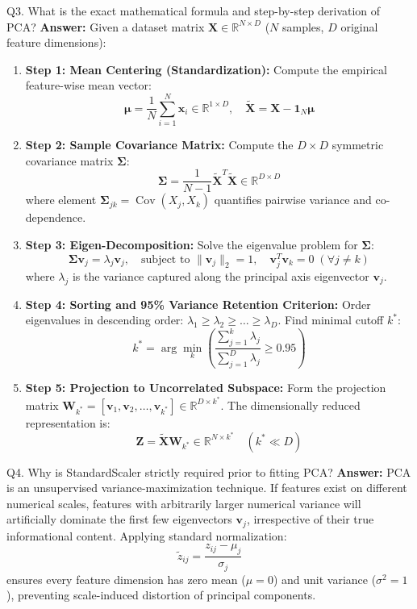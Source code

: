 \documentclass[a4paper, 11pt]{article}
\begin{document}
\begin{questionbox}{Q3. What is the exact mathematical formula and step-by-step derivation of PCA?}
\textbf{Answer:}
Given a dataset matrix $\mathbf{X} \in \mathbb{R}^{N \times D}$ ($N$ samples, $D$ original feature dimensions):

\begin{enumerate}
    \item \textbf{Step 1: Mean Centering (Standardization):}
    Compute the empirical feature-wise mean vector:
    \[
    \mathbf{\mu} = \frac{1}{N}\sum_{i=1}^N \mathbf{x}_i \in \mathbb{R}^{1 \times D}, \quad \mathbf{\tilde{X}} = \mathbf{X} - \mathbf{1}_N \mathbf{\mu}
    \]
    \item \textbf{Step 2: Sample Covariance Matrix:}
    Compute the $D \times D$ symmetric covariance matrix $\mathbf{\Sigma}$:
    \[
    \mathbf{\Sigma} = \frac{1}{N - 1}\mathbf{\tilde{X}}^T \mathbf{\tilde{X}} \in \mathbb{R}^{D \times D}
    \]
    where element $\mathbf{\Sigma}_{jk} = \operatorname{Cov}(X_j, X_k)$ quantifies pairwise variance and co-dependence.
    \item \textbf{Step 3: Eigen-Decomposition:}
    Solve the eigenvalue problem for $\mathbf{\Sigma}$:
    \[
    \mathbf{\Sigma} \mathbf{v}_j = \lambda_j \mathbf{v}_j, \quad \text{subject to } \|\mathbf{v}_j\|_2 = 1, \quad \mathbf{v}_j^T \mathbf{v}_k = 0 \; (\forall j \neq k)
    \]
    where $\lambda_j$ is the variance captured along the principal axis eigenvector $\mathbf{v}_j$.
    \item \textbf{Step 4: Sorting and 95\% Variance Retention Criterion:}
    Order eigenvalues in descending order: $\lambda_1 \ge \lambda_2 \ge \dots \ge \lambda_D$. Find minimal cutoff $k^*$:
    \[
    k^* = \arg\min_{k} \left( \frac{\sum_{j=1}^k \lambda_j}{\sum_{j=1}^D \lambda_j} \ge 0.95 \right)
    \]
    \item \textbf{Step 5: Projection to Uncorrelated Subspace:}
    Form the projection matrix $\mathbf{W}_{k^*} = [\mathbf{v}_1, \mathbf{v}_2, \dots, \mathbf{v}_{k^*}] \in \mathbb{R}^{D \times k^*}$. The dimensionally reduced representation is:
    \[
    \mathbf{Z} = \mathbf{\tilde{X}} \mathbf{W}_{k^*} \in \mathbb{R}^{N \times k^*} \quad (k^* \ll D)
    \]
\end{enumerate}
\end{questionbox}

\begin{questionbox}{Q4. Why is StandardScaler strictly required prior to fitting PCA?}
\textbf{Answer:}
PCA is an unsupervised variance-maximization technique. If features exist on different numerical scales, features with arbitrarily larger numerical variance will artificially dominate the first few eigenvectors $\mathbf{v}_j$, irrespective of their true informational content. Applying standard normalization:
\[
\tilde{z}_{ij} = \frac{z_{ij} - \mu_j}{\sigma_j}
\]
ensures every feature dimension has zero mean ($\mu = 0$) and unit variance ($\sigma^2 = 1$), preventing scale-induced distortion of principal components.
\end{questionbox}
\end{document}
